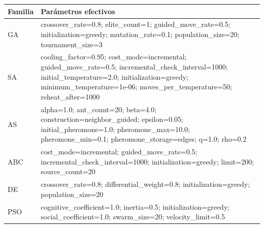 \begin{tabularx}{\linewidth}{lY}
\toprule
Familia & Parámetros efectivos \\ \midrule
GA & \ttfamily\footnotesize crossover\_rate=0.8; elite\_count=1; guided\_move\_rate=0.5; initialization=greedy; mutation\_rate=0.1; population\_size=20; tournament\_size=3 \\
SA & \ttfamily\footnotesize cooling\_factor=0.95; cost\_mode=incremental; guided\_move\_rate=0.5; incremental\_check\_interval=1000; initial\_temperature=2.0; initialization=greedy; minimum\_temperature=1e-06; moves\_per\_temperature=50; reheat\_after=1000 \\
AS & \ttfamily\footnotesize alpha=1.0; ant\_count=20; beta=4.0; construction=neighbor\_guided; epsilon=0.05; initial\_pheromone=1.0; pheromone\_max=10.0; pheromone\_min=0.1; pheromone\_storage=edges; q=1.0; rho=0.2 \\
ABC & \ttfamily\footnotesize cost\_mode=incremental; guided\_move\_rate=0.5; incremental\_check\_interval=1000; initialization=greedy; limit=200; source\_count=20 \\
DE & \ttfamily\footnotesize crossover\_rate=0.8; differential\_weight=0.8; initialization=greedy; population\_size=20 \\
PSO & \ttfamily\footnotesize cognitive\_coefficient=1.0; inertia=0.5; initialization=greedy; social\_coefficient=1.0; swarm\_size=20; velocity\_limit=0.5 \\
\bottomrule\end{tabularx}

